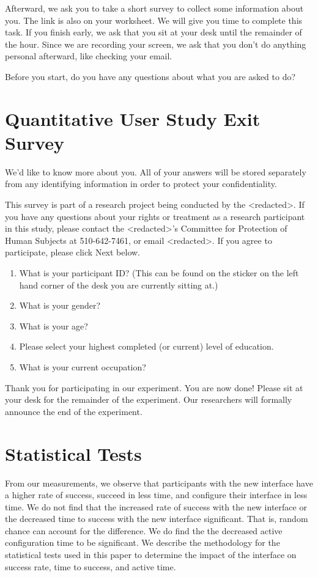 \documentclass[USenglish,oneside,twocolumn]{article}
\begin{document}
Afterward, we ask you to take a short survey to collect some information about you. The link is also on your worksheet.
We will give you time to complete this task. If you finish early, we ask that you sit at your desk until the remainder of the hour. Since we are recording your screen, we ask that you don't do anything personal afterward, like checking your email.

Before you start, do you have any questions about what you are asked to do? 

\section{Quantitative User Study Exit Survey} 
\label{quantitative-exit-survey}
We'd like to know more about you.  All of your answers will be stored separately from any identifying information in order to protect your confidentiality.

This survey is part of a research project being conducted by the <redacted>. %
If you have any questions about your rights or treatment as a research participant in this study, please contact the <redacted>'s %
Committee for Protection of Human Subjects at 510-642-7461, or email 
<redacted>. %
If you agree to participate, please click Next below.\\

\begin{enumerate}
\item{What is your participant ID? (This can be found on the sticker on the left hand corner of the desk you are currently sitting at.)}
\item{What is your gender?}
\item{What is your age?}
\item{Please select your highest completed (or current) level of education}.
\item{What is your current occupation?}  
\end{enumerate}

Thank you for participating in our experiment. You are now done! Please sit at your desk for the remainder of the experiment. Our researchers will formally announce the end of the experiment. 

\section{Statistical Tests} 
\label{stat-tests}
From our measurements, we observe that participants with the new interface 
have a higher rate of success, succeed in less time, and configure their interface in less time. 
We do not find that the increased rate of success with the new interface or the decreased time to success with the new interface significant. That is, random chance can account for the difference. 
We do find the the decreased active configuration time to be significant. 
We describe the methodology for the statistical tests used in this paper to determine the impact of the interface on success rate, time to success, and active time. 
\end{document}
